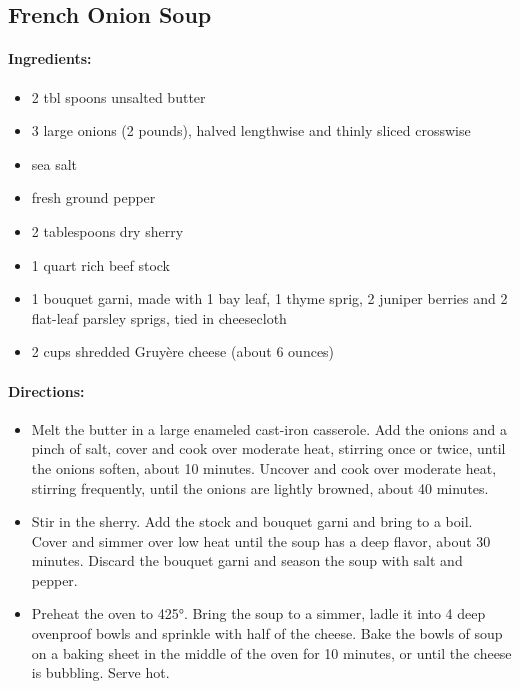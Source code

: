 \documentclass{article}
\begin{document}
\subsection{French Onion Soup}

\paragraph{Ingredients:}

\begin{itemize}
	\item 2 tbl spoons unsalted butter
	\item 3 large onions (2 pounds), halved lengthwise and thinly sliced crosswise
	\item sea salt
	\item fresh ground pepper
	\item 2 tablespoons dry sherry
	\item 1 quart rich beef stock
	\item 1 bouquet garni, made with 1 bay leaf, 1 thyme sprig, 2 juniper berries and 2 flat-leaf parsley sprigs, tied in cheesecloth
	\item 2 cups shredded Gruyère cheese (about 6 ounces)
\end{itemize}

\paragraph{Directions:}
\begin{itemize}
	\item Melt the butter in a large enameled cast-iron casserole. Add the onions and a pinch of salt, cover and cook over moderate heat, stirring once or twice, until the onions soften, about 10 minutes. Uncover and cook over moderate heat, stirring frequently, until the onions are lightly browned, about 40 minutes.
	\item Stir in the sherry. Add the stock and bouquet garni and bring to a boil. Cover and simmer over low heat until the soup has a deep flavor, about 30 minutes. Discard the bouquet garni and season the soup with salt and pepper.
	\item Preheat the oven to 425°. Bring the soup to a simmer, ladle it into 4 deep ovenproof bowls and sprinkle with half of the cheese. Bake the bowls of soup on a baking sheet in the middle of the oven for 10 minutes, or until the cheese is bubbling. Serve hot.
\end{itemize}
\end{document}
